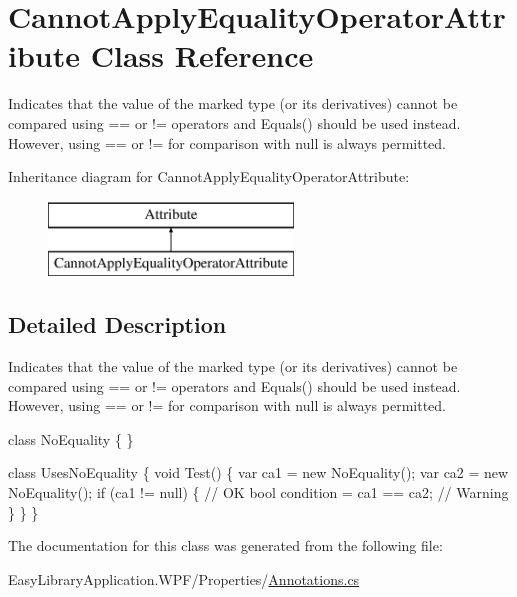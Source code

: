 \hypertarget{class_cannot_apply_equality_operator_attribute}{}\section{Cannot\+Apply\+Equality\+Operator\+Attribute Class Reference}
\label{class_cannot_apply_equality_operator_attribute}


Indicates that the value of the marked type (or its derivatives) cannot be compared using \textquotesingle{}==\textquotesingle{} or \textquotesingle{}!=\textquotesingle{} operators and {\ttfamily Equals()} should be used instead. However, using \textquotesingle{}==\textquotesingle{} or \textquotesingle{}!=\textquotesingle{} for comparison with {\ttfamily null} is always permitted.  


Inheritance diagram for Cannot\+Apply\+Equality\+Operator\+Attribute\+:\begin{figure}[H]
\begin{center}
\leavevmode
\includegraphics[height=2.000000cm]{class_cannot_apply_equality_operator_attribute}
\end{center}
\end{figure}


\subsection{Detailed Description}
Indicates that the value of the marked type (or its derivatives) cannot be compared using \textquotesingle{}==\textquotesingle{} or \textquotesingle{}!=\textquotesingle{} operators and {\ttfamily Equals()} should be used instead. However, using \textquotesingle{}==\textquotesingle{} or \textquotesingle{}!=\textquotesingle{} for comparison with {\ttfamily null} is always permitted. 


\begin{DoxyCode}
[CannotApplyEqualityOperator]
\textcolor{keyword}{class }NoEquality \{ \}

\textcolor{keyword}{class }UsesNoEquality \{
  \textcolor{keywordtype}{void} Test() \{
    var ca1 = \textcolor{keyword}{new} NoEquality();
    var ca2 = \textcolor{keyword}{new} NoEquality();
    \textcolor{keywordflow}{if} (ca1 != null) \{ \textcolor{comment}{// OK}
      \textcolor{keywordtype}{bool} condition = ca1 == ca2; \textcolor{comment}{// Warning}
    \}
  \}
\}
\end{DoxyCode}


The documentation for this class was generated from the following file\+:\begin{DoxyCompactItemize}
\item 
Easy\+Library\+Application.\+W\+P\+F/\+Properties/\mbox{\hyperlink{_annotations_8cs}{Annotations.\+cs}}\end{DoxyCompactItemize}
